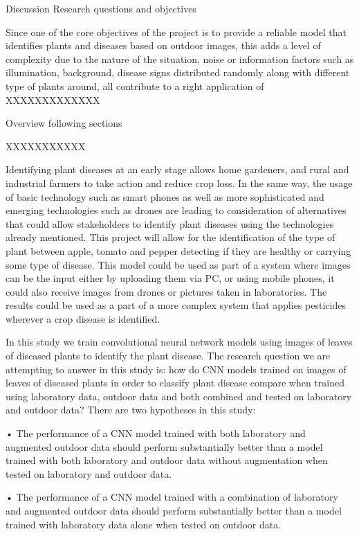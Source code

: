 \documentclass[conference]{IEEEtran}
\begin{document}
 Discussion Research questions and objectives 

Since one of the core objectives of the project is to provide a reliable model that identifies plants and diseases based on outdoor images, this adds a level of complexity due to the nature of the situation, noise or information factors such as illumination, background, disease signs distributed randomly along with different type of plants around, all contribute to a right application of XXXXXXXXXXXXX 

Overview following sections 

XXXXXXXXXXX 

Identifying plant diseases at an early stage allows home gardeners, and rural and industrial farmers to take action and reduce crop loss. In the same way, the usage of basic technology such as smart phones as well as more sophisticated and emerging technologies such as drones are leading to consideration of alternatives that could allow stakeholders to identify plant diseases using the technologies already mentioned. This project will allow for the identification of the type of plant between apple, tomato and pepper detecting if they are healthy or carrying some type of disease. This model could be used as part of a system where images can be the input either by uploading them via PC, or using mobile phones, it could also receive images from drones or pictures taken in laboratories. The results could be used as a part of a more complex system that applies pesticides wherever a crop disease is identified. 

In this study we train convolutional neural network models using images of leaves of diseased plants to identify the plant disease. The research question we are attempting to answer in this study is: how do CNN models trained on images of leaves of diseased plants in order to classify plant disease compare when trained using laboratory data, outdoor data and both combined and tested on laboratory and outdoor data? There are two hypotheses in this study:  

• The performance of a CNN model trained with both laboratory and augmented outdoor data should perform substantially better than a model trained with both laboratory and outdoor data without augmentation when tested on laboratory and outdoor data.  

• The performance of a CNN model trained with a combination of laboratory and augmented outdoor data should perform substantially better than a model trained with laboratory data alone when tested on outdoor data. 
\end{document}

